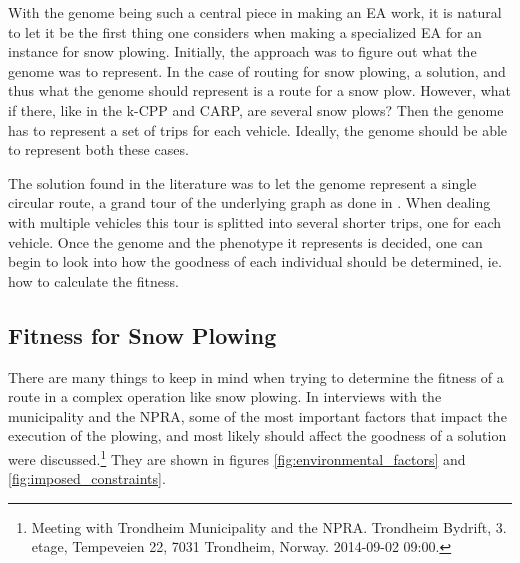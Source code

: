With the genome being such a central piece in making an EA work, it is natural to let it be the first thing one considers when making a specialized EA for an instance for snow plowing. Initially, the approach was to figure out what the genome was to represent. In the case of routing for snow plowing, a solution, and thus what the genome should represent is a route for a snow plow. However, what if there, like in the k-CPP and CARP, are several snow plows? Then the genome has to represent a set of trips for each vehicle. Ideally, the genome should be able to represent both these cases.

The solution found in the literature was to let the genome represent a single circular route, a grand tour of the underlying graph as done in \citet{lacomme2001GA}. When dealing with multiple vehicles this tour is splitted into several shorter trips, one for each vehicle. Once the genome and the phenotype it represents is decided, one can begin to look into how the goodness of each individual should be determined, ie. how to calculate the fitness.



\subsection{Fitness for Snow Plowing} %
\label{sub:fitness_for_snow_plowing}

There are many things to keep in mind when trying to determine the fitness of a route in a complex operation like snow plowing. In interviews with the municipality and the NPRA, some of the most important factors that impact the execution of the plowing, and most likely should affect the goodness of a solution were discussed.\footnote{Meeting with Trondheim Municipality and the NPRA. Trondheim Bydrift, 3. etage, Tempeveien 22, 7031 Trondheim, Norway. 2014-09-02 09:00.} They are shown in figures \ref{fig:environmental_factors} and \ref{fig:imposed_constraints}.


